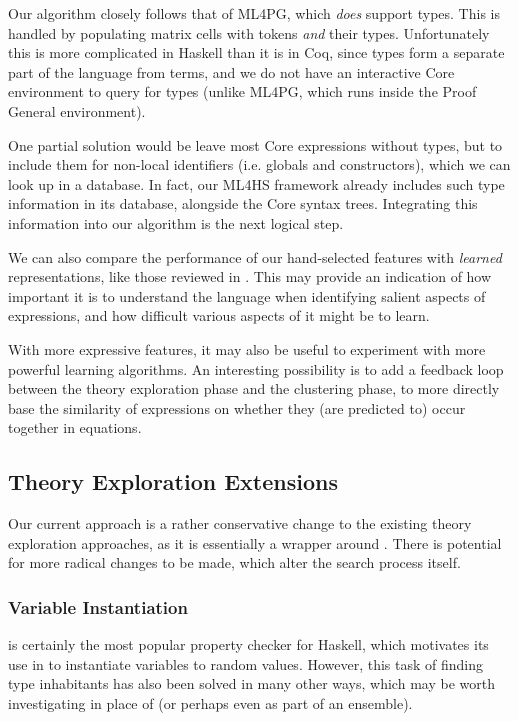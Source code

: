 Our algorithm closely follows that of ML4PG, which \emph{does} support types. This is handled by populating matrix cells with tokens \emph{and} their types. Unfortunately this is more complicated in Haskell than it is in Coq, since types form a separate part of the language from terms, and we do not have an interactive Core environment to query for types (unlike ML4PG, which runs inside the Proof General environment).

One partial solution would be leave most Core expressions without types, but to include them for non-local identifiers (i.e. globals and constructors), which we can look up in a database. In fact, our ML4HS framework already includes such type information in its database, alongside the Core syntax trees. Integrating this information into our algorithm is the next logical step.

We can also compare the performance of our hand-selected features with \emph{learned} representations, like those reviewed in \citep{bengio2013representation}. This may provide an indication of how important it is to understand the language when identifying salient aspects of expressions, and how difficult various aspects of it might be to learn.

With more expressive features, it may also be useful to experiment with more powerful learning algorithms. An interesting possibility is to add a feedback loop between the theory exploration phase and the clustering phase, to more directly base the similarity of expressions on whether they (are predicted to) occur together in equations.

\subsection{Theory Exploration Extensions}

Our current approach is a rather conservative change to the existing theory exploration approaches, as it is essentially a wrapper around \qspec{}. There is potential for more radical changes to be made, which alter the search process itself.

\subsubsection{Variable Instantiation}

\qcheck{} is certainly the most popular property checker for Haskell, which motivates its use in \qspec{} to instantiate variables to random values. However, this task of finding type inhabitants has also been solved in many other ways, which may be worth investigating in place of \qcheck{} (or perhaps even as part of an ensemble).

